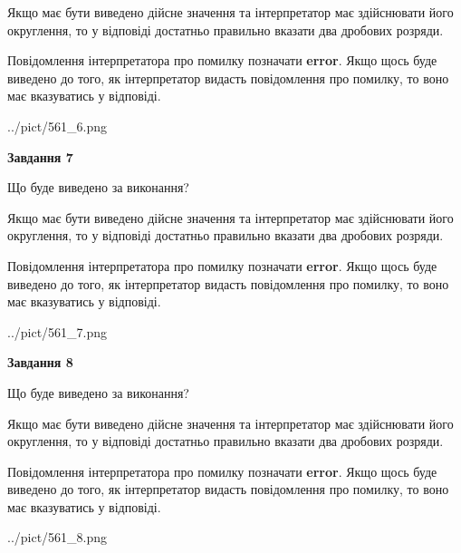 \documentclass[12pt, ukrainian]{article}
\begin{document}
{\begin {Large}
Якщо має бути виведено дійсне значення та інтерпретатор має здійснювати його округлення, 
то у відповіді достатньо правильно вказати два дробових розряди.

Повідомлення інтерпретатора про помилку позначати \textbf{error}.
Якщо щось буде виведено до того, як інтерпретатор видасть повідомлення про помилку, 
то воно має вказуватись у відповіді. \par

\begin{center}
	{../pict/561_6.png}
\end{center}
\newpage

{\begin {center}\textbf{Завдання 7}\end {center}}\par
Що буде виведено за виконання? \par

Якщо має бути виведено дійсне значення та інтерпретатор має здійснювати його округлення, 
то у відповіді достатньо правильно вказати два дробових розряди.

Повідомлення інтерпретатора про помилку позначати \textbf{error}.
Якщо щось буде виведено до того, як інтерпретатор видасть повідомлення про помилку, 
то воно має вказуватись у відповіді. \par

\begin{center}
	{../pict/561_7.png}
\end{center}
\newpage

{\begin {center}\textbf{Завдання 8}\end {center}}\par
Що буде виведено за виконання? \par

Якщо має бути виведено дійсне значення та інтерпретатор має здійснювати його округлення, 
то у відповіді достатньо правильно вказати два дробових розряди.

Повідомлення інтерпретатора про помилку позначати \textbf{error}.
Якщо щось буде виведено до того, як інтерпретатор видасть повідомлення про помилку, 
то воно має вказуватись у відповіді. \par

\begin{center}
	{../pict/561_8.png}
\end{center}
\newpage


\end{Large}}
\end{document}
